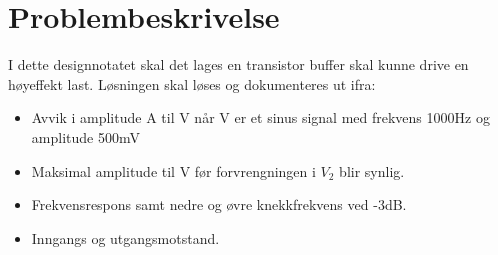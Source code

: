 \section{Problembeskrivelse}
\label{problemBeskrivelse}


I dette designnotatet skal det lages en transistor buffer skal kunne drive en høyeffekt last. Løsningen skal løses og dokumenteres ut ifra:
\begin{itemize}
\item Avvik i amplitude A til V når V er et sinus signal med frekvens 1000Hz og amplitude 500mV
\item Maksimal amplitude til V  før forvrengningen i $V_2$ blir synlig.
\item Frekvensrespons samt nedre og øvre knekkfrekvens ved -3dB.
\item Inngangs og utgangsmotstand.
\end{itemize}

